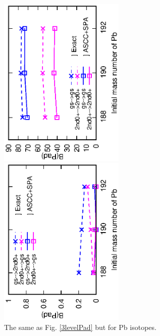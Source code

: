 \documentclass[%
superscriptaddress,
showpacs,
nofootinbib,
amsmath,amssymb,
aps,
prc,
twocolumn,
floatfix ]%
{revtex4-1}
\begin{document}
\begin{figure}[htbp]
 \begin{center}
  \includegraphics[width=60mm,angle=-90]{Pbintra_trans.eps}
 \end{center}
 \begin{center}
  \includegraphics[width=60mm,angle=-90]{Pbinter_trans.eps}
 \end{center}
	\caption{The same as Fig. \ref{3levelPad} but for Pb isotopes.
}
 \label{PbPad}
\end{figure}
\end{document}
